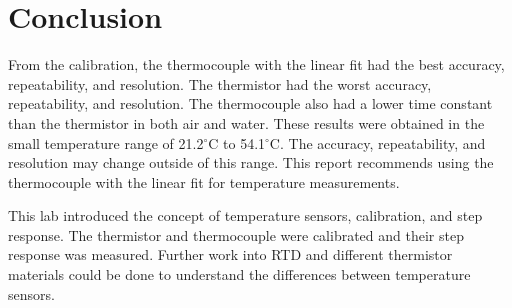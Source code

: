\section{Conclusion}
\label{sec:conclusion}

\noindent From the calibration, the thermocouple with the linear fit had the best accuracy, repeatability, and resolution.
The thermistor had the worst accuracy, repeatability, and resolution. The thermocouple also had a lower time constant
than the thermistor in both air and water. 
These results were obtained in the small temperature range of 21.2$^\circ$C to 54.1$^\circ$C. The accuracy, repeatability, and resolution
may change outside of this range.
This report recommends using the thermocouple with the linear fit for temperature measurements.

This lab introduced the concept of temperature sensors, calibration, and step response. The thermistor and thermocouple
were calibrated and their step response was measured. Further work into RTD and different thermistor materials
could be done to understand the differences between temperature sensors.
